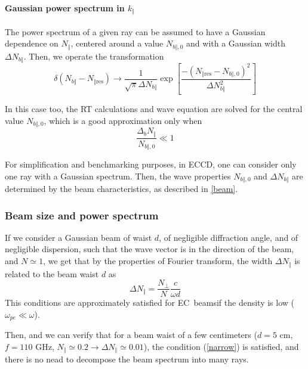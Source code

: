 \paragraph{Gaussian power spectrum in $k_{\Vert}$}

\bigskip The power spectrum of a given ray can be assumed to have a Gaussian
dependence on $N_{\Vert}$, centered around a value $N_{b\Vert,0}$ and with a
Gaussian width $\Delta N_{b\Vert}$. Then, we operate the transformation%
\begin{equation}
\delta\left(  N_{b\Vert}-N_{\Vert\text{res}}\right)  \rightarrow\frac{1}%
{\sqrt{\pi}\Delta N_{b\Vert}}\exp\left[  \frac{-\left(  N_{\Vert\text{res}%
}-N_{b\Vert,0}\right)  ^{2}}{\Delta N_{b\Vert}^{2}}\right]  \label{gaussian}%
\end{equation}

In this case too, the RT calculations and wave equation are solved for the
central value $N_{b\Vert,0}$, which is a good approximation only when
\begin{equation}
\frac{\Delta_{b}N_{\Vert}}{N_{b\Vert,0}}\ll1 \label{narrow}%
\end{equation}

For simplification and benchmarking purposes, in ECCD, one can consider only
one ray with a Gaussian spectrum. Then, the wave properties $N_{b\Vert,0}$ and
$\Delta N_{b\Vert}$ are determined by the beam characteristics, as described
in \ref{beam}.

\subsubsection{Beam size and power spectrum\label{beam}}

\bigskip If we consider a Gaussian beam of waist $d$, of negligible
diffraction angle, and of negligible dispersion, such that the wave vector is
in the direction of the beam, and $N\simeq1$, we get that by the properties of
Fourier transform, the width $\Delta N_{\Vert}$ is related to the beam waist
$d$ as
\begin{equation}
\Delta N_{\Vert}=\frac{N_{\bot}}{N}\frac{c}{\omega d}%
\end{equation}
This conditions are approximately satisfied for EC\ beamsif the density is low
($\omega_{pe}\ll\omega$).

Then, and we can verify that for a beam waist of a few centimeters ($d=5$ cm,
$f=110$ GHz, $N_{\Vert}\simeq0.2\rightarrow\Delta N_{\Vert}\simeq0.01$), the
condition (\ref{narrow}) is satisfied, and there is no nead to decompose the
beam spectrum into many rays.
